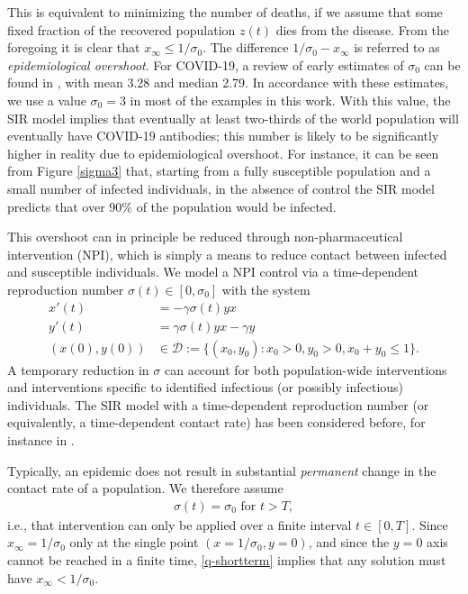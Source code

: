 \documentclass[english,12pt,letter]{article}
\newcommand{\Rnot}{\sigma_0}
\newcommand{\Sinf}{x_\infty}
\newcommand{\dom}{{\mathcal D}}
\begin{document}
This is equivalent to minimizing the number of deaths, if we assume that
some fixed fraction of the recovered population $z(t)$ dies from the disease.
From the foregoing it is clear that $\Sinf \le 1/\Rnot$.  The difference
$1/\Rnot-\Sinf$ is referred to as {\em epidemiological overshoot}.
For COVID-19, a review of early estimates of $\Rnot$ can be found in
\cite[Table 1]{liu2020reproductive}, with mean 3.28 and median 2.79.
In accordance with these estimates, we use a value $\Rnot=3$ in most of
the examples in this work.  With this value, the SIR model implies that eventually
at least two-thirds of the world population will eventually have COVID-19 antibodies;
this number is likely to be significantly higher in reality due to epidemiological
overshoot.  For instance, it can be seen from Figure \ref{sigma3} that, starting
from a fully susceptible population and a small number of infected individuals,
in the absence of control the SIR model predicts that over $90\%$ of the population
would be infected.

This overshoot can in principle be reduced through
non-pharmaceutical intervention (NPI), which is simply a means to
reduce contact between infected and susceptible individuals.  We model a NPI
control via a time-dependent reproduction number $\sigma(t)\in[0,\Rnot]$ with the system
\begin{subequations} \label{SIRq}
\begin{align}
    x'(t) & = -\gamma \sigma(t) y x \\
    y'(t) & = \gamma \sigma(t) y x - \gamma y \\
    (x(0),y(0)) & \in \dom := \{(x_0,y_0) : x_0 > 0, y_0 > 0, x_0+y_0 \le 1\}.
\end{align}
\end{subequations}
A temporary reduction in $\sigma$ can account for both
population-wide interventions and interventions specific to identified infectious
(or possibly infectious) individuals.  The SIR model with a time-dependent
reproduction number (or equivalently, a time-dependent contact rate) has been 
considered before, for instance in \cite{sun2020tracking}.

Typically, an epidemic does not result in substantial {\em permanent} change in the contact rate of
a population.  We therefore assume 
\begin{align} \label{q-shortterm}
    \sigma(t)=\Rnot \text{ for } t>T,
\end{align}
i.e., that intervention can only be applied over a finite interval $t \in [0,T]$.
Since $x_\infty=1/\sigma_0$ only at the single point $(x=1/\sigma_0,y=0)$, and since 
the $y=0$ axis cannot be reached in a finite time, \eqref{q-shortterm} implies
that any solution must have $x_\infty<1/\sigma_0$.
\end{document}
